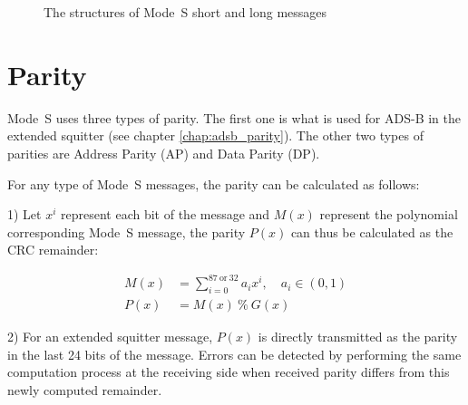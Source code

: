 \begin{figure}[!ht]
  \centering
  \caption{The structures of Mode~S short and long messages}
  \label{fig:modes_msg_structures}
\end{figure}




\section{Parity} \label{sec:parity}

Mode~S uses three types of parity. The first one is what is used for ADS-B in the extended squitter (see chapter \ref{chap:adsb_parity}). The other two types of parities are Address Parity (AP) and Data Parity (DP).

For any type of Mode~S messages, the parity can be calculated as follows:

1) Let  $x^{i}$ represent each bit of the message and $M(x)$ represent the polynomial corresponding Mode~S message, the parity $P(x)$ can thus be calculated as the CRC remainder:

\begin{equation} \label{eq:crc}
  \begin{split}
    M(x) &= \sum_{i=0}^{87~\mathrm{or}~32} a_i x^i , \quad a_i \in (0, 1)\\
    P(x) &= M(x) ~ \% ~ G(x)
  \end{split}
\end{equation}

2) For an extended squitter message, $P(x)$ is directly transmitted as the parity in the last 24 bits of the message. Errors can be detected by performing the same computation process at the receiving side when received parity differs from this newly computed remainder.

